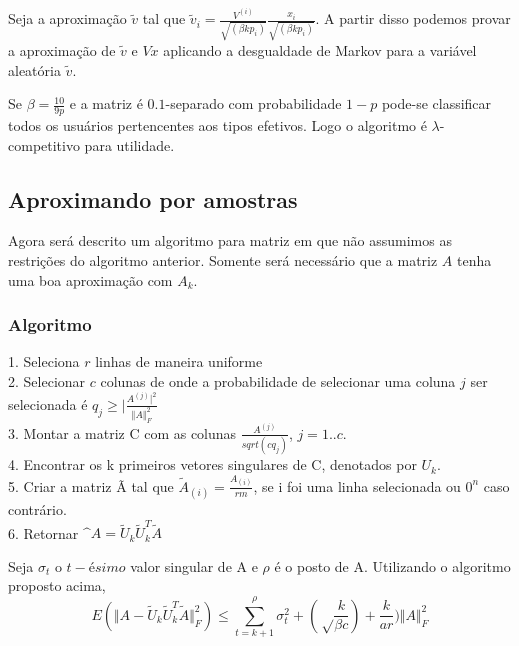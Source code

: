 \documentclass[a4paper,10pt]{article}
\begin{document}
Seja a aproximação $\tilde v$ tal que $\tilde v_i = \frac {V^{(i)}}{\sqrt{(\beta k p_i)}} \frac{x_i}{\sqrt{(\beta k p_i)}}$.
 A partir disso podemos provar a aproximação de $\tilde v$ e $Vx$ aplicando a desgualdade de Markov para a variável 
aleatória $\tilde v$.


\begin{coro}
Se $\beta = \frac{10}{9p}$ e a matriz é $0.1$-separado com probabilidade $1 - p$
pode-se classificar todos os usuários pertencentes aos tipos efetivos. Logo o 
algoritmo é $\lambda$-competitivo  para utilidade.
\end{coro}

\subsection{Aproximando por amostras}

Agora será descrito um algoritmo para matriz em que não assumimos as restrições
do algoritmo anterior. Somente será necessário que a matriz $A$ tenha uma boa 
aproximação com $A_k$.

\subsubsection{Algoritmo}

1. Seleciona $r$ linhas de maneira uniforme \\
2. Selecionar $c$ colunas de onde a probabilidade de selecionar uma coluna $j$ ser selecionada
é  $q_j \geq \vert \frac{A^{(j)} \vert^2}{\Vert A \Vert^2_F}$ \\
3. Montar a matriz C com as colunas $\frac{A^(j)}{sqrt(cq_j)}$, $j = 1 .. c$. \\
4. Encontrar os k primeiros vetores singulares de C, denotados por $U_k$. \\
5. Criar a matriz Ã tal que 
$\tilde A_{(i)}  = \frac{A_{(i)}}{rm}$, se i foi uma linha selecionada ou $0^n$ caso contrário. \\
6. Retornar $\^A = \tilde U_k \tilde U_k^T \tilde A$


\begin{teo}
Seja $\sigma_t$ o $t-ésimo$ valor singular de A e $\rho$ é o posto de A. Utilizando
o algoritmo proposto acima, 
\begin{equation}
E(\Vert A - \tilde U_k \tilde U_k^T \tilde A \Vert^2_F) \leq \sum_{t = k + 1}^\rho \sigma_t^2 + 
(\sqrt\frac{k}{\beta c})  + \frac{k}{ar})\Vert A \Vert^2_F
\end{equation}
\end{teo}
\end{document}
